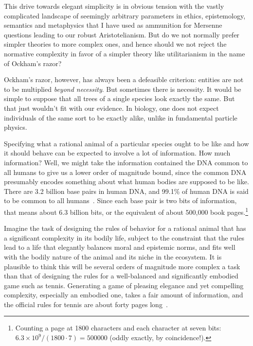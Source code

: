 This drive towards elegant simplicity is in obvious tension with the vastly complicated landscape of seemingly
arbitrary parameters in ethics, epistemology, semantics and metaphysics that I have used as ammunition for
Mersenne questions leading to our robust Aristotelianism. 
But do we not normally prefer simpler theories to more complex ones, and hence should we not reject the normative
complexity in favor of a simpler theory like utilitarianism in the name of Ockham's razor?

Ockham's razor, however, has always been a defeasible criterion: entities are not to be multiplied \textit{beyond necessity}.
But sometimes there is necessity. It would be simple to suppose that all trees of a single species look exactly the same.
But that just wouldn't fit with our evidence. In biology, one does not expect individuals of the same sort to be exactly
alike, unlike in fundamental particle physics.

Specifying what a rational animal of a particular species ought to be like
and how it should behave can be expected to involve a lot of information. How much information? Well, we might take the information contained
the DNA common to all humans to give us a lower order of magnitude bound, since the common DNA presumably encodes something
about what human bodies are supposed to be like. There are 3.2 billion base pairs in human DNA, and 
99.1\% of human DNA is said to be common to all humans~\parencite[Ch.~6]{Nizami}.
Since each base pair is two bits of information, that means about 6.3 billion bits, or the equivalent of about 500,000
book pages.\footnote{Counting a page at 1800 characters and each character at seven bits: $6.3\times 10^9/(1800\cdot 7)=500000$
(oddly exactly, by coincidence!).} 

Imagine the task of designing the rules of behavior for a rational animal that has a significant complexity in its bodily
life, subject to the constraint that the rules lead to a life that elegantly balances moral and epistemic norms, and fits
well with the bodily nature of the animal and its niche in the ecosystem. It is plausible to think this will be several
orders of magnitude more complex a task than that of designing the rules for a well-balanced and significantly embodied game 
such as tennis. Generating a game of pleasing elegance and yet compelling complexity, especially an embodied one, takes a 
fair amount of information, and the official rules for tennis are about forty pages long~\parencite{ITF}.

